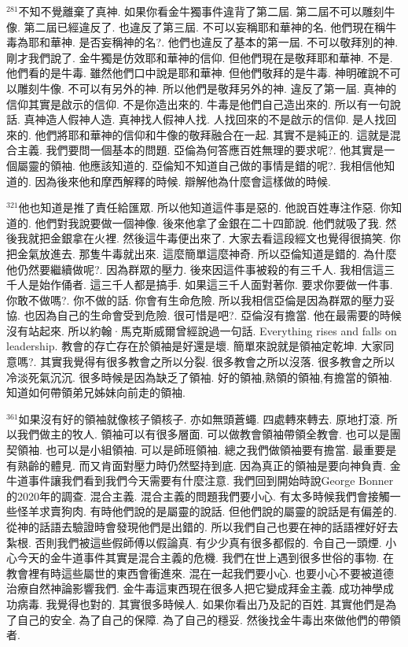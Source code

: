 \documentclass{book}
\begin{document}
$^{281}$不知不覺離棄了真神.
如果你看金牛獨事件違背了第二屆.
第二屆不可以雕刻牛像.
第二屆已經違反了.
也違反了第三屆.
不可以妄稱耶和華神的名.
他們現在稱牛毒為耶和華神.
是否妄稱神的名?.
他們也違反了基本的第一屆.
不可以敬拜別的神.
剛才我們說了.
金牛獨是仿效耶和華神的信仰.
但他們現在是敬拜耶和華神.
不是.
他們看的是牛毒.
雖然他們口中說是耶和華神.
但他們敬拜的是牛毒.
神明確說不可以雕刻牛像.
不可以有另外的神.
所以他們是敬拜另外的神.
違反了第一屆.
真神的信仰其實是啟示的信仰.
不是你造出來的.
牛毒是他們自己造出來的.
所以有一句說話.
真神造人假神人造.
真神找人假神人找.
人找回來的不是啟示的信仰.
是人找回來的.
他們將耶和華神的信仰和牛像的敬拜融合在一起.
其實不是純正的.
這就是混合主義.
我們要問一個基本的問題.
亞倫為何答應百姓無理的要求呢?.
他其實是一個屬靈的領袖.
他應該知道的.
亞倫知不知道自己做的事情是錯的呢?.
我相信他知道的.
因為後來他和摩西解釋的時候.
辯解他為什麼會這樣做的時候.

$^{321}$他也知道是推了責任給匯眾.
所以他知道這件事是惡的.
他說百姓專注作惡.
你知道的.
他們對我說要做一個神像.
後來他拿了金銀在二十四節說.
他們就吸了我.
然後我就把金銀拿在火裡.
然後這牛毒便出來了.
大家去看這段經文也覺得很搞笑.
你把金氣放進去.
那隻牛毒就出來.
這麼簡單這麼神奇.
所以亞倫知道是錯的.
為什麼他仍然要繼續做呢?.
因為群眾的壓力.
後來因這件事被殺的有三千人.
我相信這三千人是始作俑者.
這三千人都是搞手.
如果這三千人面對著你.
要求你要做一件事.
你敢不做嗎?.
你不做的話.
你會有生命危險.
所以我相信亞倫是因為群眾的壓力妥協.
也因為自己的生命會受到危險.
很可惜是吧?.
亞倫沒有擔當.
他在最需要的時候沒有站起來.
所以約翰·馬克斯威爾曾經說過一句話.
Everything rises and falls on leadership.
教會的存亡存在於領袖是好還是壞.
簡單來說就是領袖定乾坤.
大家同意嗎?.
其實我覺得有很多教會之所以分裂.
很多教會之所以沒落.
很多教會之所以冷淡死氣沉沉.
很多時候是因為缺乏了領袖.
好的領袖,熟領的領袖,有擔當的領袖.
知道如何帶領弟兄姊妹向前走的領袖.

$^{361}$如果沒有好的領袖就像核子領核子.
亦如無頭蒼蠅.
四處轉來轉去.
原地打滾.
所以我們做主的牧人.
領袖可以有很多層面.
可以做教會領袖帶領全教會.
也可以是團契領袖.
也可以是小組領袖.
可以是師班領袖.
總之我們做領袖要有擔當.
最重要是有熟齡的體見.
而又肯面對壓力時仍然堅持到底.
因為真正的領袖是要向神負責.
金牛道事件讓我們看到我們今天需要有什麼注意.
我們回到開始時說George Bonner的2020年的調查.
混合主義.
混合主義的問題我們要小心.
有太多時候我們會接觸一些怪羊求賣狗肉.
有時他們說的是屬靈的說話.
但他們說的屬靈的說話是有偏差的.
從神的話語去驗證時會發現他們是出錯的.
所以我們自己也要在神的話語裡好好去紮根.
否則我們被這些假師傅以假論真.
有少少真有很多都假的.
令自己一頭煙.
小心今天的金牛道事件其實是混合主義的危機.
我們在世上遇到很多世俗的事物.
在教會裡有時這些屬世的東西會衝進來.
混在一起我們要小心.
也要小心不要被道德治療自然神論影響我們.
金牛毒這東西現在很多人把它變成拜金主義.
成功神學成功病毒.
我覺得也對的.
其實很多時候人.
如果你看出乃及記的百姓.
其實他們是為了自己的安全.
為了自己的保障.
為了自己的穩妥.
然後找金牛毒出來做他們的帶領者.
\end{document}
